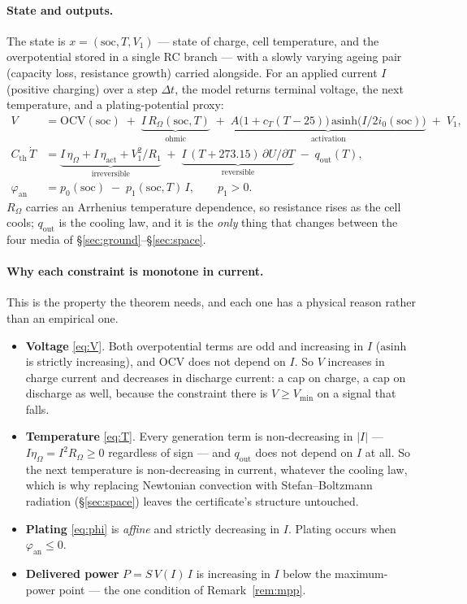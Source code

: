 \documentclass[11pt,letterpaper]{article}
\theoremstyle{definition}
\theoremstyle{remark}
\begin{document}
\paragraph{State and outputs.} The state is $x = (\mathrm{soc}, T, V_1)$ --- state of charge,
cell temperature, and the overpotential stored in a single RC branch --- with a slowly varying
ageing pair (capacity loss, resistance growth) carried alongside. For an applied current $I$
(positive charging) over a step $\Delta t$, the model returns terminal voltage, the next
temperature, and a plating-potential proxy:
\begin{align}
V &= \mathrm{OCV}(\mathrm{soc}) \;+\; \underbrace{I\,R_\Omega(\mathrm{soc},T)}_{\text{ohmic}}
   \;+\; \underbrace{A\big(1+c_T (T-25)\big)\,\mathrm{asinh}\!\big(I/2i_0(\mathrm{soc})\big)}_{\text{activation}}
   \;+\; V_1, \label{eq:V}\\[2pt]
C_{\mathrm{th}}\,\dot T &= \underbrace{I\,\eta_\Omega + I\,\eta_{\mathrm{act}}
   + V_1^2/R_1}_{\text{irreversible}} \;+\; \underbrace{I\,(T+273.15)\,\partial U/\partial T}_{\text{reversible}}
   \;-\; q_{\mathrm{out}}(T), \label{eq:T}\\[2pt]
\varphi_{\mathrm{an}} &= p_0(\mathrm{soc}) \;-\; p_1(\mathrm{soc},T)\,I, \qquad p_1 > 0.
\label{eq:phi}
\end{align}
$R_\Omega$ carries an Arrhenius temperature dependence, so resistance rises as the cell cools;
$q_{\mathrm{out}}$ is the cooling law, and it is the \emph{only} thing that changes between the
four media of \S\ref{sec:ground}--\S\ref{sec:space}.

\paragraph{Why each constraint is monotone in current.} This is the property the theorem needs,
and each one has a physical reason rather than an empirical one.
\begin{itemize}\itemsep1pt
\item \textbf{Voltage} \eqref{eq:V}. Both overpotential terms are odd and increasing in $I$
($\mathrm{asinh}$ is strictly increasing), and $\mathrm{OCV}$ does not depend on $I$. So $V$
increases in charge current and decreases in discharge current: a cap on charge, a cap on
discharge as well, because the constraint there is $V \ge V_{\min}$ on a signal that falls.
\item \textbf{Temperature} \eqref{eq:T}. Every generation term is non-decreasing in $|I|$ ---
$I\eta_\Omega = I^2 R_\Omega \ge 0$ regardless of sign --- and $q_{\mathrm{out}}$ does not
depend on $I$ at all. So the next temperature is non-decreasing in current, whatever the cooling
law, which is why replacing Newtonian convection with Stefan--Boltzmann radiation
(\S\ref{sec:space}) leaves the certificate's structure untouched.
\item \textbf{Plating} \eqref{eq:phi} is \emph{affine} and strictly decreasing in $I$. Plating
occurs when $\varphi_{\mathrm{an}} \le 0$.
\item \textbf{Delivered power} $P = S\,V(I)\,I$ is increasing in $I$ below the maximum-power
point --- the one condition of Remark~\ref{rem:mpp}.
\end{itemize}
\end{document}
